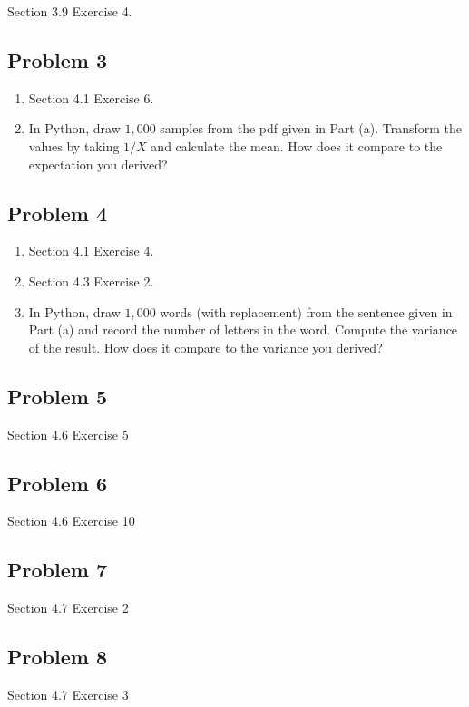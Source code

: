 \documentclass[12pt]{article}\usepackage[]{graphicx}\usepackage[]{color}
\begin{document}
Section 3.9 Exercise 4. \\


\subsection*{Problem 3}

\begin{enumerate}[label=(\alph*)]
  \item Section 4.1 Exercise 6.

  \item In Python, draw $1,000$ samples from the pdf given in Part (a).
  Transform the values by taking $1/X$ and calculate the mean. How does it
  compare to the expectation you derived?

\end{enumerate}


\subsection*{Problem 4}

\begin{enumerate}[label=(\alph*)]
  \item Section 4.1 Exercise 4.

  \item Section 4.3 Exercise 2.

  \item In Python, draw $1,000$ words (with replacement) from the sentence given
  in Part (a) and record the number of letters in the word. Compute the variance
  of the result. How does it compare to the variance you derived?

\end{enumerate}


\subsection*{Problem 5}

Section 4.6 Exercise 5


\subsection*{Problem 6}

Section 4.6 Exercise 10


\subsection*{Problem 7}

Section 4.7 Exercise 2


\subsection*{Problem 8}

Section 4.7 Exercise 3
\end{document}
